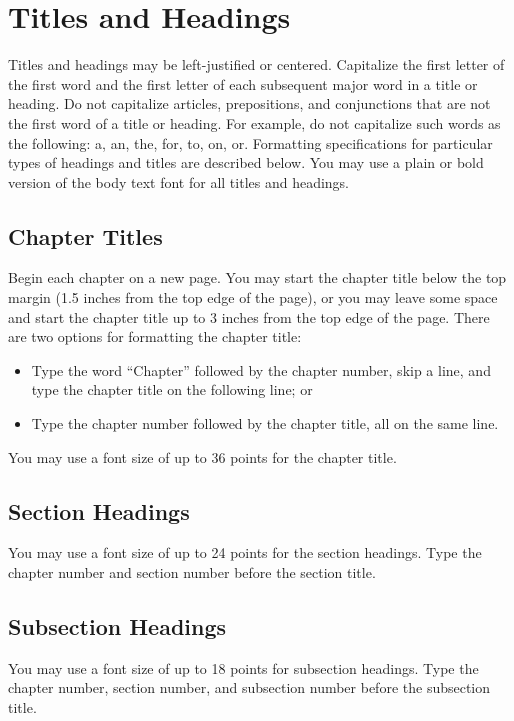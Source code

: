 \section{Titles and Headings}

Titles and headings may be left-justified or centered.  Capitalize the first
letter of the first word and the first letter of each subsequent major word in
a title or heading.  Do not capitalize articles, prepositions, and conjunctions
that are not the first word of a title or heading.  For example, do not
capitalize such words as the following: a, an, the, for, to, on, or.
Formatting specifications for particular types of headings and titles are
described below.  You may use a plain or bold version of the body text font for
all titles and headings.

\subsection{Chapter Titles}

Begin each chapter on a new page.  You may start the chapter title below the
top margin  (1.5 inches from the top edge of the page), or you may leave some
space and start the chapter title up to 3 inches from the top edge of the page.
There are two options for formatting the chapter title:
\begin{itemize}
\item Type the word ``Chapter'' followed by the chapter number, skip a
  line, and type the chapter title on the following line; or
\item Type the chapter number followed by the chapter title, all on
  the same line.
\end{itemize}
You may use a font size of up to 36 points for the chapter title.  

\subsection{Section Headings}

You may use a font size of up to 24 points for the section headings.  Type the
chapter number and section number before the section title.

\subsection{Subsection Headings}

You may use a font size of up to 18 points for subsection headings.  Type the
chapter number, section number, and subsection number before the subsection
title.

